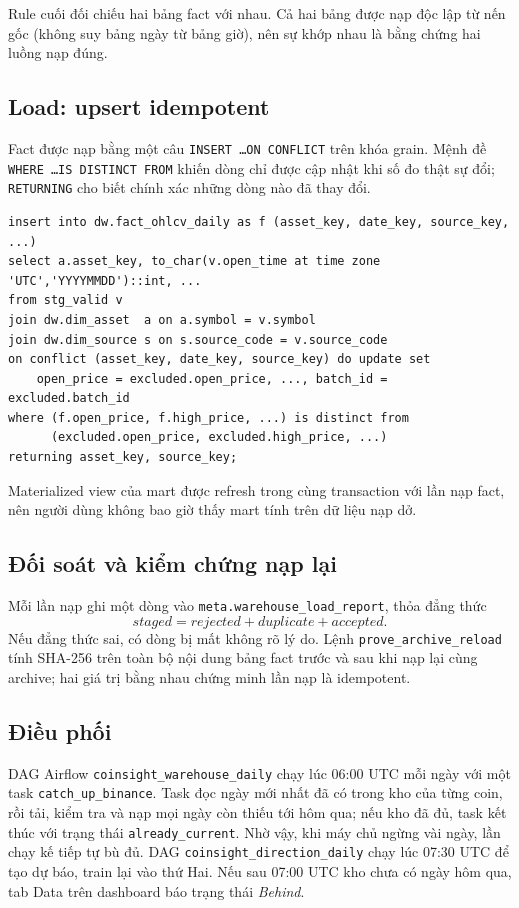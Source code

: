 \documentclass[11pt,a4paper]{article}
\newcommand{\code}[1]{\texttt{#1}}
\begin{document}
Rule cuối đối chiếu hai bảng fact với nhau. Cả hai bảng được nạp độc lập từ nến gốc
(không suy bảng ngày từ bảng giờ), nên sự khớp nhau là bằng chứng hai luồng nạp đúng.

\subsection{Load: upsert idempotent}
Fact được nạp bằng một câu \code{INSERT \ldots ON CONFLICT} trên khóa grain. Mệnh đề
\code{WHERE \ldots IS DISTINCT FROM} khiến dòng chỉ được cập nhật khi số đo thật sự đổi;
\code{RETURNING} cho biết chính xác những dòng nào đã thay đổi.

\begin{lstlisting}[language=psql]
insert into dw.fact_ohlcv_daily as f (asset_key, date_key, source_key, ...)
select a.asset_key, to_char(v.open_time at time zone 'UTC','YYYYMMDD')::int, ...
from stg_valid v
join dw.dim_asset  a on a.symbol = v.symbol
join dw.dim_source s on s.source_code = v.source_code
on conflict (asset_key, date_key, source_key) do update set
    open_price = excluded.open_price, ..., batch_id = excluded.batch_id
where (f.open_price, f.high_price, ...) is distinct from
      (excluded.open_price, excluded.high_price, ...)
returning asset_key, source_key;
\end{lstlisting}

Materialized view của mart được refresh trong cùng transaction với lần nạp fact, nên người
dùng không bao giờ thấy mart tính trên dữ liệu nạp dở.

\subsection{Đối soát và kiểm chứng nạp lại}
Mỗi lần nạp ghi một dòng vào \code{meta.warehouse\_load\_report}, thỏa đẳng thức
\[ staged = rejected + duplicate + accepted. \]
Nếu đẳng thức sai, có dòng bị mất không rõ lý do. Lệnh \code{prove\_archive\_reload} tính
SHA-256 trên toàn bộ nội dung bảng fact trước và sau khi nạp lại cùng archive; hai giá trị
bằng nhau chứng minh lần nạp là idempotent.

\subsection{Điều phối}
DAG Airflow \code{coinsight\_warehouse\_daily} chạy lúc 06:00 UTC mỗi ngày với một task
\code{catch\_up\_binance}. Task đọc ngày mới nhất đã có trong kho của từng coin, rồi tải, kiểm tra
và nạp mọi ngày còn thiếu tới hôm qua; nếu kho đã đủ, task kết thúc với trạng thái
\code{already\_current}. Nhờ vậy, khi máy chủ ngừng vài ngày, lần chạy kế tiếp tự bù đủ. DAG \code{coinsight\_direction\_daily} chạy lúc 07:30 UTC
để tạo dự báo, train lại vào thứ Hai. Nếu sau 07:00 UTC kho chưa có ngày hôm qua, tab Data trên
dashboard báo trạng thái \emph{Behind}.
\end{document}
